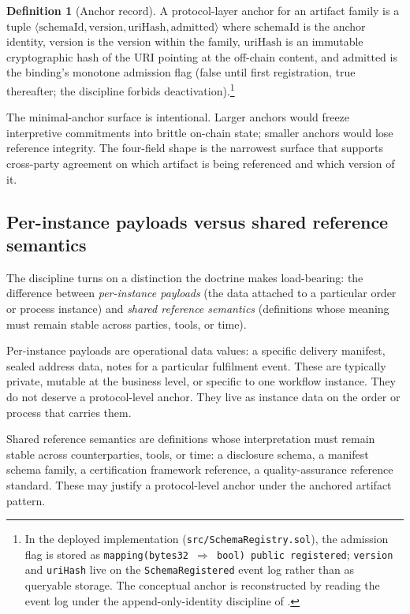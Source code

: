 \documentclass[11pt,a4paper]{article}
\theoremstyle{definition}
\newtheorem{definition}[theorem]{Definition}
\theoremstyle{remark}
\newcommand{\schemaid}{\mathrm{schemaId}}
\begin{document}
\begin{definition}[Anchor record]
\label{def:anchor}
A protocol-layer anchor for an artifact family is a tuple
$\langle \schemaid, \mathrm{version}, \mathrm{uriHash},
\mathrm{admitted} \rangle$ where $\schemaid$ is the anchor identity,
$\mathrm{version}$ is the version within the family,
$\mathrm{uriHash}$ is an immutable cryptographic hash of the
URI pointing at the off-chain content, and $\mathrm{admitted}$ is
the binding's monotone admission flag (false until first
registration, true thereafter; the discipline forbids
deactivation).\footnote{In the deployed implementation
(\texttt{src/SchemaRegistry.sol}), the admission flag is stored as
\texttt{mapping(bytes32 \(\Rightarrow\) bool) public registered};
\texttt{version} and \texttt{uriHash} live on the
\texttt{SchemaRegistered} event log rather than as queryable storage.
The conceptual anchor is reconstructed by reading the event log under
the append-only-identity discipline of .}
\end{definition}

The minimal-anchor surface is intentional. Larger anchors would
freeze interpretive commitments into brittle on-chain state; smaller
anchors would lose reference integrity. The four-field shape is the
narrowest surface that supports cross-party agreement on which
artifact is being referenced and which version of it.

\subsection{Per-instance payloads versus shared reference semantics}

The discipline turns on a distinction the doctrine makes load-bearing:
the difference between \emph{per-instance payloads} (the data
attached to a particular order or process instance) and \emph{shared
reference semantics} (definitions whose meaning must remain stable
across parties, tools, or time).

Per-instance payloads are operational data values: a specific
delivery manifest, sealed address data, notes for a particular
fulfilment event. These are typically private, mutable at the
business level, or specific to one workflow instance. They do not
deserve a protocol-level anchor. They live as instance data on the
order or process that carries them.

Shared reference semantics are definitions whose interpretation must
remain stable across counterparties, tools, or time: a disclosure
schema, a manifest schema family, a certification framework
reference, a quality-assurance reference standard. These may justify
a protocol-level anchor under the anchored artifact pattern.
\end{document}
